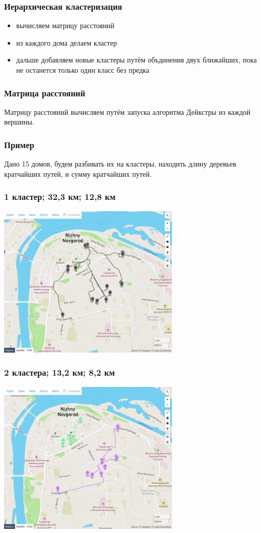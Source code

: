 \documentclass{beamer}
\begin{document}
\begin{frame}
	\frametitle{Иерархическая кластеризация}
	\begin{itemize}
		\item вычисляем матрицу расстояний
		\item из каждого дома делаем кластер
		\item дальше добавляем новые кластеры путём объдинения двух ближайших, пока не останется только один класс без предка
	\end{itemize}
\end{frame}

\begin{frame}
	\frametitle{Матрица расстояний}
	Матрицу расстояний вычисляем путём запуска алгоритма Дейкстры из каждой вершины.
\end{frame}

\begin{frame}
	\frametitle{Пример}
	Дано 15 домов, будем разбивать их на кластеры, находить длину деревьев кратчайших путей, и сумму кратчайших путей.

\end{frame}

\begin{frame}
	\frametitle{1 кластер; 32,3 км; 12,8 км}
	\centering
	\includegraphics[width=0.65\textwidth]{k1}
\end{frame}

\begin{frame}
	\frametitle{2 кластера; 13,2 км; 8,2 км}
	\centering
	\includegraphics[width=0.65\textwidth]{k2}
\end{frame}
\end{document}
